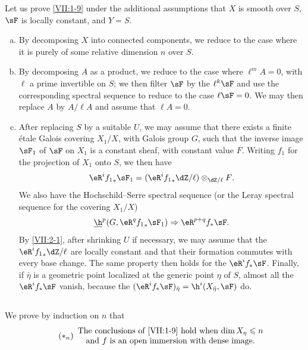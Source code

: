 Let us prove \ref{VII:1-9} under the additional assumptions that $X$ is smooth
over $S$, $\sF$ is locally constant, and $Y=S$.
\begin{enumerate}[a)]
  \item By decomposing $X$ into connected components, we reduce to the case
    where it is purely of some relative dimension $n$ over $S$.
  \item By decomposing $A$ as a product, we reduce to the case where
    $\ell^m A=0$, with $\ell$ a prime invertible on $S$; we then filter $\sF$
    by the $\ell^k \sF$ and use the corresponding spectral sequence to reduce
    to the case $\ell\sF=0$. We may then replace $A$ by $A/\ell A$ and assume
    that $\ell A=0$.
  \item After replacing $S$ by a suitable $U$, we may assume that there exists
    a finite étale Galois covering $X_1/X$, with Galois group $G$, such that
    the inverse image $\sF_1$ of $\sF$ on $X_1$ is a constant sheaf, with
    constant value $F$. Writing $f_1$ for the projection of $X_1$ onto $S$,
    we then have
    \[
      \eR^i {f_1}_\ast \sF_1 = (\eR^i {f_1}_\ast \dZ/\ell)\otimes_{\dZ/\ell} F \text{.} 
    \]
    We also have the Hochschild--Serre spectral sequence (or the Leray
    spectral sequence for the covering $X_1/X$)
    \[
      \underline\h^p(G,\eR^q {f_1}_\ast \sF_1) \Rightarrow \eR^{p+q} f_\ast \sF \text{.} 
    \]
    By \ref{VII:2-1}, after shrinking $U$ if necessary, we may assume that
    the $\eR^i {f_1}_\ast \dZ/\ell$ are locally constant and that their
    formation commutes with every base change. The same property then holds
    for the $\eR^i f_\ast \sF$. Finally, if $\bar\eta$ is a geometric point
    localized at the generic point $\eta$ of $S$, almost all the
    $\eR^i f_\ast\sF$ vanish, because the
    $(\eR^i f_\ast \sF)_{\bar\eta} = \h^i(X_{\bar \eta},\sF)$ do.
\end{enumerate}





\subsection{}\label{VII:2-3}

We prove by induction on $n$ that
\begin{equation*}\tag{$\ast_n$}\label{VII:eq:2-3-1}
  \begin{array}{c}
    \text{The conclusions of \ref{VII:1-9} hold when $\dim{X_\eta}\leqslant n$} \\
    \text{and $f$ is an open immersion with dense image.}
  \end{array}
\end{equation*}

